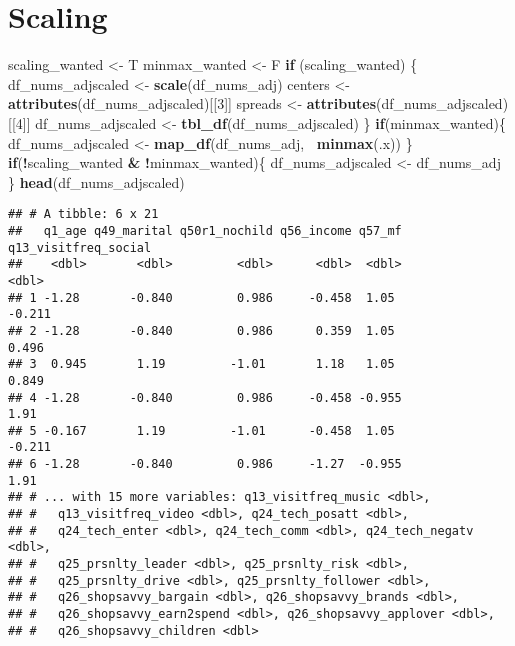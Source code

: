 \documentclass[]{article}
\newenvironment{Shaded}{\begin{snugshade}}{\end{snugshade}}
\newcommand{\KeywordTok}[1]{\textcolor[rgb]{0.13,0.29,0.53}{\textbf{#1}}}
\newcommand{\DecValTok}[1]{\textcolor[rgb]{0.00,0.00,0.81}{#1}}
\newcommand{\StringTok}[1]{\textcolor[rgb]{0.31,0.60,0.02}{#1}}
\newcommand{\ControlFlowTok}[1]{\textcolor[rgb]{0.13,0.29,0.53}{\textbf{#1}}}
\newcommand{\OperatorTok}[1]{\textcolor[rgb]{0.81,0.36,0.00}{\textbf{#1}}}
\newcommand{\NormalTok}[1]{#1}
\begin{document}
\begin{Shaded}
\end{Shaded}

\section{Scaling}\label{scaling}

\begin{Shaded}
\begin{Highlighting}[]
\NormalTok{scaling_wanted <-}\StringTok{ }\NormalTok{T}
\NormalTok{minmax_wanted <-}\StringTok{ }\NormalTok{F}
\ControlFlowTok{if}\NormalTok{ (scaling_wanted) \{}
\NormalTok{  df_nums_adjscaled <-}\StringTok{ }\KeywordTok{scale}\NormalTok{(df_nums_adj)}
\NormalTok{  centers <-}\StringTok{ }\KeywordTok{attributes}\NormalTok{(df_nums_adjscaled)[[}\DecValTok{3}\NormalTok{]]}
\NormalTok{  spreads <-}\StringTok{ }\KeywordTok{attributes}\NormalTok{(df_nums_adjscaled)[[}\DecValTok{4}\NormalTok{]]}
\NormalTok{  df_nums_adjscaled <-}\StringTok{ }\KeywordTok{tbl_df}\NormalTok{(df_nums_adjscaled)}
\NormalTok{\}}
\ControlFlowTok{if}\NormalTok{(minmax_wanted)\{}
\NormalTok{  df_nums_adjscaled <-}\StringTok{ }\KeywordTok{map_df}\NormalTok{(df_nums_adj, }\OperatorTok{~}\KeywordTok{minmax}\NormalTok{(.x))}
\NormalTok{\}}
\ControlFlowTok{if}\NormalTok{(}\OperatorTok{!}\NormalTok{scaling_wanted }\OperatorTok{&}\StringTok{ }\OperatorTok{!}\NormalTok{minmax_wanted)\{}
\NormalTok{  df_nums_adjscaled <-}\StringTok{ }\NormalTok{df_nums_adj}
\NormalTok{\}}
\KeywordTok{head}\NormalTok{(df_nums_adjscaled)}
\end{Highlighting}
\end{Shaded}

\begin{verbatim}
## # A tibble: 6 x 21
##   q1_age q49_marital q50r1_nochild q56_income q57_mf q13_visitfreq_social
##    <dbl>       <dbl>         <dbl>      <dbl>  <dbl>                <dbl>
## 1 -1.28       -0.840         0.986     -0.458  1.05                -0.211
## 2 -1.28       -0.840         0.986      0.359  1.05                 0.496
## 3  0.945       1.19         -1.01       1.18   1.05                 0.849
## 4 -1.28       -0.840         0.986     -0.458 -0.955                1.91 
## 5 -0.167       1.19         -1.01      -0.458  1.05                -0.211
## 6 -1.28       -0.840         0.986     -1.27  -0.955                1.91 
## # ... with 15 more variables: q13_visitfreq_music <dbl>,
## #   q13_visitfreq_video <dbl>, q24_tech_posatt <dbl>,
## #   q24_tech_enter <dbl>, q24_tech_comm <dbl>, q24_tech_negatv <dbl>,
## #   q25_prsnlty_leader <dbl>, q25_prsnlty_risk <dbl>,
## #   q25_prsnlty_drive <dbl>, q25_prsnlty_follower <dbl>,
## #   q26_shopsavvy_bargain <dbl>, q26_shopsavvy_brands <dbl>,
## #   q26_shopsavvy_earn2spend <dbl>, q26_shopsavvy_applover <dbl>,
## #   q26_shopsavvy_children <dbl>
\end{verbatim}
\end{document}
